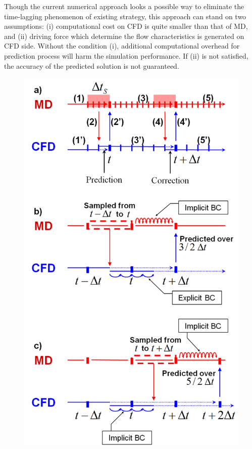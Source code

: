 \documentclass[conference,final]{IEEEtran}
\begin{document}
Though the current numerical approach looks a possible way to eliminate the time-lagging phenomenon of existing strategy, this approach can stand on two assumptions: (i) computational cost on CFD is quite smaller than that of MD, and (ii) driving force which determine the flow characteristics is generated on CFD side. Without the condition (i), additional computational overhead for prediction process will harm the simulation performance. If (ii) is not satisfied, the accuracy of the predicted solution is not guaranteed.


\begin{figure}[ht]
\centering
\includegraphics[width=1.0\linewidth]{Prediction_Correction_Full.pdf}

\end{figure}
\end{document}
